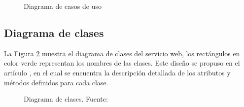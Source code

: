 \begin{figure}[!ht]
	\centering
    \caption{Diagrama de casos de uso} %
    \label{casoUso1}
\end{figure}

\subsection{Diagrama de clases}

La Figura \ref{diagramaClases1} muestra el diagrama de clases del servicio web, los rect\'angulos en color verde representan los nombres de las clases. Este dise\~{n}o se propuso en el art\'iculo \cite{SOMIdiseno}, en el cual se encuentra la descripci\'on detallada de los atributos y m\'etodos definidos para cada clase.

\begin{figure}[!ht]
	\centering
    \caption{Diagrama de clases. Fuente: \cite{SOMIdiseno}} %
    \label{diagramaClases1}
\end{figure}

